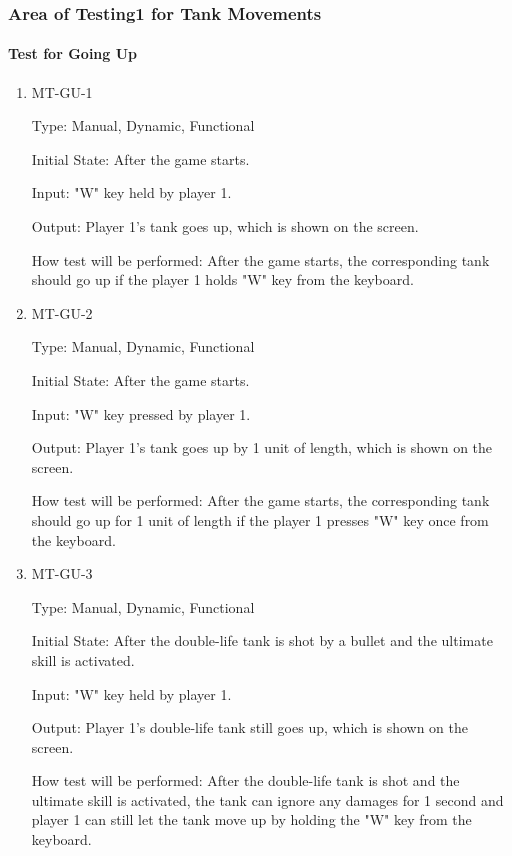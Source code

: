 \documentclass[12pt, titlepage]{article}
\begin{document}
\subsubsection{Area of Testing1 for Tank Movements}

\paragraph{Test for Going Up}

\begin{enumerate}

\item{MT-GU-1\\}

Type: Manual, Dynamic, Functional
					
Initial State: After the game starts.
					
Input: "W" key held by player 1.
					
Output: Player 1's tank goes up, which is shown on the screen.
					
How test will be performed: After the game starts, the corresponding tank should go up if the player 1 holds "W" key from the keyboard. 
					
\item{MT-GU-2\\}

Type: Manual, Dynamic, Functional
					
Initial State: After the game starts.
					
Input: "W" key pressed by player 1.
					
Output: Player 1's tank goes up by 1 unit of length, which is shown on the screen.
					
How test will be performed: After the game starts, the corresponding tank should go up for 1 unit of length if the player 1 presses "W" key once from the keyboard. 

\item{MT-GU-3\\}

Type: Manual, Dynamic, Functional
					
Initial State: After the double-life tank is shot by a bullet and the ultimate skill is activated.
					
Input: "W" key held by player 1.
					
Output: Player 1's double-life tank still goes up, which is shown on the screen.
					
How test will be performed: After the double-life tank is shot and the ultimate skill is activated, the tank can ignore any damages for 1 second and player 1 can still let the tank move up by holding the "W" key from the keyboard.


\end{enumerate}
\end{document}
